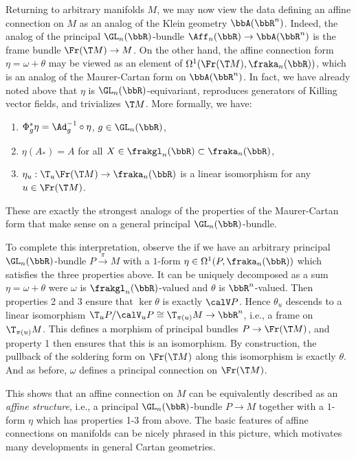 \begin{rem}\label{rem 1.3.6 Cap}
    Returning to arbitrary manifolds $M$, we may now view the data defining an affine connection on $M$ as an analog of the Klein geometry $\bbA(\bbR^n)$. Indeed, the analog of the principal $\GL_n(\bbR)$-bundle $\Aff_n(\bbR)\to \bbA(\bbR^n)$ is the frame bundle $\Fr(\T M)\to M$. On the other hand, the affine connection form $\eta=\omega+\theta$ may be viewed as an element of $\Omega^1(\Fr(\T M),\fraka_n(\bbR))$, which is an analog of the Maurer-Cartan form on $\bbA(\bbR^n)$. In fact, we have already noted above that $\eta$ is $\GL_n(\bbR)$-equivariant, reproduces generators of Killing vector fields, and trivializes $\T M$. More formally, we have:
    \begin{enumerate}
        \item $\Phi_g^\ast \eta=\Ad_g^{-1}\circ \eta$, $g\in\GL_n(\bbR)$,
        \item $\eta(A_\ast)=A$ for all $X\in\frakgl_n(\bbR)\subset\fraka_n(\bbR)$,
        \item $\eta_u:\T_u\Fr(\T M)\to \fraka_n(\bbR)$ is a linear isomorphism for any $u\in\Fr(\T M)$.
    \end{enumerate}
    These are exactly the strongest analogs of the properties of the Maurer-Cartan form that make sense on a general principal $\GL_n(\bbR)$-bundle.

    To complete this interpretation, observe the if we have an arbitrary principal $\GL_n(\bbR)$-bundle $P\overset{\pi}{\to}M$ with a $1$-form $\eta\in\Omega^1(P,\fraka_n(\bbR))$ which satisfies the three properties above. It can be uniquely decomposed as a sum $\eta=\omega+\theta$ were $\omega$ is $\frakgl_n(\bbR)$-valued and $\theta$ is $\bbR^n$-valued. Then properties 2 and 3 ensure that $\ker\theta$ is exactly $\calV P$. Hence $\theta_u$ descends to a linear isomorphism $\T_u P\slash \calV_u P\cong \T_{\pi(u)}M\to \bbR^n$, i.e., a frame on $\T_{\pi(u)}M$. This defines a morphism of principal bundles $P\to \Fr(\T M)$, and property 1 then ensures that this is an isomorphism. By construction, the pullback of the soldering form on $\Fr(\T M)$ along this isomorphism is exactly $\theta$. And as before, $\omega$ defines a principal connection on $\Fr(\T M)$.

    This shows that an affine connection on $M$ can be equivalently described as an \emph{affine structure}, i.e., a principal $\GL_n(\bbR)$-bundle $P\to M$ together with a $1$-form $\eta$ which has properties 1-3 from above. The basic features of affine connections on manifolds can be nicely phrased in this picture, which motivates many developments in general Cartan geometries.
\end{rem}



